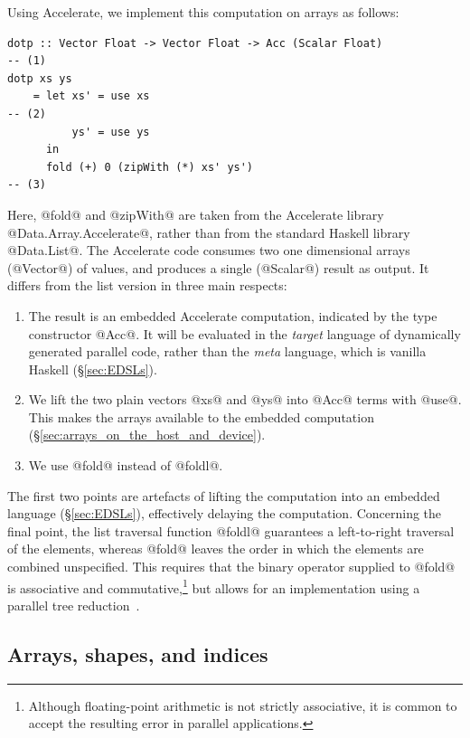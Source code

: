 Using Accelerate, we implement this computation on arrays as follows:
%
\begin{lstlisting}[style=haskell]
dotp :: Vector Float -> Vector Float -> Acc (Scalar Float)                         -- (1)
dotp xs ys
    = let xs' = use xs                                                             -- (2)
          ys' = use ys
      in
      fold (+) 0 (zipWith (*) xs' ys')                                             -- (3)
\end{lstlisting}
%
Here, @fold@ and @zipWith@ are taken from the Accelerate library
@Data.Array.Accelerate@, rather than from the standard Haskell library
@Data.List@. The Accelerate code consumes two one dimensional arrays (@Vector@)
of values, and produces a single (@Scalar@) result as output. It differs from
the list version in three main respects:
%
\begin{enumerate}
    \item The result is an embedded Accelerate computation, indicated by the
        type constructor @Acc@. It will be evaluated in the \emph{target}
        language\lang[target]{} of dynamically generated parallel code, rather
        than the \emph{meta} language\lang[object]{}, which is vanilla Haskell
        (\S\ref{sec:EDSLs}).

    \item We lift the two plain vectors @xs@ and @ys@ into @Acc@ terms with
        @use@. This makes the arrays available to the embedded computation
        (\S\ref{sec:arrays_on_the_host_and_device}).

    \item We use @fold@ instead of @foldl@.
\end{enumerate}
%
The first two points are artefacts of lifting the computation into an embedded
language (\S\ref{sec:EDSLs}), effectively delaying the computation. Concerning
the final point, the list traversal function @foldl@ guarantees a left-to-right
traversal of the elements, whereas @fold@ leaves the order in which the elements
are combined unspecified. This requires that the binary operator supplied to
@fold@ is associative and commutative,\footnote{Although floating-point
arithmetic is not strictly associative, it is common to accept the resulting
error in parallel applications.} but allows for an implementation using a
parallel tree reduction~\cite{Chatterjee:1990vj,Sengupta:2007tc}.


\subsection{Arrays, shapes, and indices}
\label{sec:arrays_shapes_and_indices}


